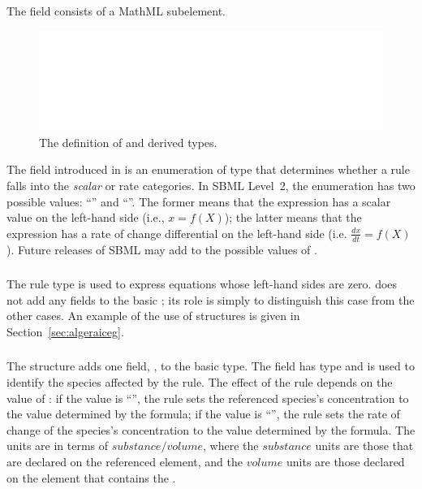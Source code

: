 \documentclass[10pt]{cekarticle}
\begin{document}
The  field consists of a MathML 
subelement.

\begin{figure}[htb]
  \centering
  \includegraphics[scale = 0.68]{rule}
  \caption{The definition of  and derived types.}
  \label{fig:rules}
\end{figure}

The  field introduced in  is an
enumeration of type  that determines whether a
rule falls into the \emph{scalar} or {rate} categories. In
SBML Level~2, the enumeration has two possible values:
``'' and ``''.  The former means that
the expression has a scalar value on the left-hand side (i.e., $x
= f(X)$); the latter means that
the expression has a rate of change differential on the left-hand
side (i.e. $\frac{d x}{d t} = f(X)$). Future releases of SBML may
add to the possible values of .

\subsubsection{}

The rule type  is used to express equations
whose left-hand sides are zero.   does not
add any fields to the basic ; its role is simply to
distinguish this case from the other cases.  An example of the use
of  structures is given in
Section~\ref{sec:algeraiceg}.

\subsubsection{}

The  structure adds one field,
, to the basic  type.  The
field  has type  and is used to
identify the species affected by the rule.  The effect of the rule
depends on the value of : if the value is
``'', the rule sets the referenced species's
concentration to the value determined by the formula; if the value
is ``'', the rule sets the rate of change of the
species's concentration to the value determined by the formula.
The units are in terms of $substance/volume$, where the
$substance$ units are those that are declared on the referenced
 element, and the $volume$ units are those declared
on the  element that contains the
.
\end{document}
